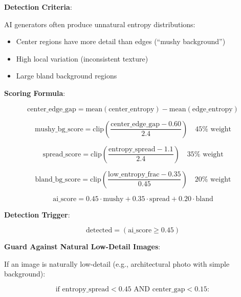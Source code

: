 \documentclass[12pt,a4paper]{book}
\begin{document}
\textbf{Detection Criteria}:

AI generators often produce unnatural entropy distributions:

\begin{itemize}
    \item Center regions have more detail than edges (``mushy background'')
    \item High local variation (inconsistent texture)
    \item Large bland background regions
\end{itemize}

\textbf{Scoring Formula}:

\begin{equation}
\text{center\_edge\_gap} = \text{mean}(\text{center\_entropy}) - \text{mean}(\text{edge\_entropy})
\end{equation}

\begin{equation}
\text{mushy\_bg\_score} = \text{clip}\left(\frac{\text{center\_edge\_gap} - 0.60}{2.4}\right) \quad 45\% \text{ weight}
\end{equation}

\begin{equation}
\text{spread\_score} = \text{clip}\left(\frac{\text{entropy\_spread} - 1.1}{2.4}\right) \quad 35\% \text{ weight}
\end{equation}

\begin{equation}
\text{bland\_bg\_score} = \text{clip}\left(\frac{\text{low\_entropy\_frac} - 0.35}{0.45}\right) \quad 20\% \text{ weight}
\end{equation}

\begin{equation}
\text{ai\_score} = 0.45 \cdot \text{mushy} + 0.35 \cdot \text{spread} + 0.20 \cdot \text{bland}
\end{equation}

\textbf{Detection Trigger}:

\begin{equation}
\text{detected} = (\text{ai\_score} \geq 0.45)
\end{equation}

\textbf{Guard Against Natural Low-Detail Images}:

If an image is naturally low-detail (e.g., architectural photo with simple background):

\begin{equation}
\text{if entropy\_spread} < 0.45 \text{ AND center\_gap} < 0.15:
\end{equation}
\end{document}
